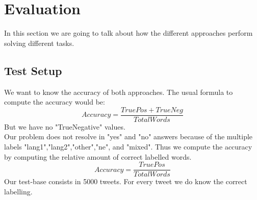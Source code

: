 \section{Evaluation}\label{sec:Evaluation}
In this section we are going to talk about how the different approaches perform solving different tasks. 
\subsection{Test Setup}
We want to know the accuracy of both approaches. The usual formula to compute the accuracy would be:
\[Accuracy = \frac{TruePos+TrueNeg}{TotalWords}\]
But we have no "TrueNegative" values. \\
Our problem does not resolve in "yes" and "no" answers because of the multiple labels "lang1","lang2","other","ne", and "mixed". Thus we compute the accuracy by computing the relative amount of correct labelled words.
\[Accuracy = \frac{TruePos}{TotalWords}\]
Our test-base consists in 5000 tweets. For every tweet we do know the correct labelling.


